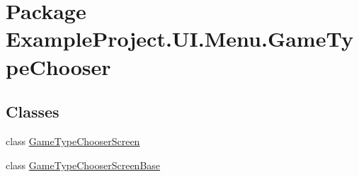 \hypertarget{namespace_example_project_1_1_u_i_1_1_menu_1_1_game_type_chooser}{}\section{Package Example\+Project.\+U\+I.\+Menu.\+Game\+Type\+Chooser}
\label{namespace_example_project_1_1_u_i_1_1_menu_1_1_game_type_chooser}
\subsection*{Classes}
\begin{DoxyCompactItemize}
\item 
class \hyperlink{class_example_project_1_1_u_i_1_1_menu_1_1_game_type_chooser_1_1_game_type_chooser_screen}{Game\+Type\+Chooser\+Screen}
\item 
class \hyperlink{class_example_project_1_1_u_i_1_1_menu_1_1_game_type_chooser_1_1_game_type_chooser_screen_base}{Game\+Type\+Chooser\+Screen\+Base}
\end{DoxyCompactItemize}
